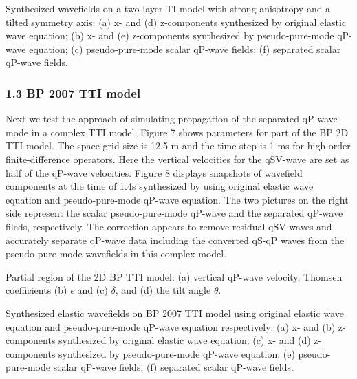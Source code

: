 {
Synthesized wavefields on a two-layer TI model with strong anisotropy and a tilted symmetry axis: (a) x- and 
(d) z-components synthesized by original elastic wave equation; (b) x- and
 (e) z-components synthesized by pseudo-pure-mode qP-wave equation; 
 (c) pseudo-pure-mode scalar qP-wave fields; (f) separated scalar qP-wave fields.
}


\subsubsection{1.3 BP 2007 TTI model}

Next we test the approach of simulating propagation of the separated qP-wave mode
in a complex TTI model. Figure 7 shows parameters for part of
the BP 2D TTI model. The space grid size is 12.5 m and the time step is 1 ms for 
high-order finite-difference operators. Here the vertical velocities for the qSV-wave are set as
 half of the qP-wave velocities. 
Figure 8 displays snapshots of wavefield components at the time of 1.4s
synthesized by using original elastic wave equation and pseudo-pure-mode qP-wave equation.
The two pictures on
the right side represent the scalar pseudo-pure-mode qP-wave and the separated qP-wave fileds, respectively.
The correction appears to remove residual qSV-waves and accurately separate qP-wave data 
including the converted qS-qP waves from
the pseudo-pure-mode wavefields in this complex model.

{
Partial region of the 2D BP TTI model: (a) vertical qP-wave velocity, Thomsen coefficients
 (b) $\epsilon$ and (c) $\delta$, and (d) the tilt angle $\theta$. 
}

{
Synthesized elastic wavefields on BP 2007 TTI model using original elastic wave equation and pseudo-pure-mode 
qP-wave equation respectively: (a) x- and 
(b) z-components synthesized by original elastic wave equation; (c) x- and
 (d) z-components synthesized by pseudo-pure-mode qP-wave equation; 
 (e) pseudo-pure-mode scalar qP-wave fields; (f) separated scalar qP-wave fields.
}


